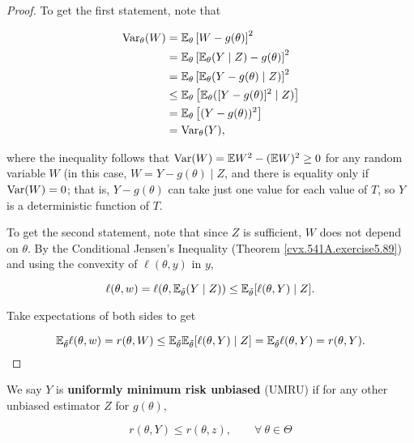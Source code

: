 \begin{proof} 

To get the first statement, note that

\begin{align*}
\Var_\theta(W) & = \mathbb{E}_\theta\left[W - g(\theta) \right]^2 
\\ & = \mathbb{E}_\theta\left[ \E_\theta(Y \mid Z) - g(\theta)\right]^2 
\\ & = \mathbb{E}_\theta\left[ \E_\theta(Y - g(\theta) \mid Z) \right]^2
\\ &  \leq  \mathbb{E}_\theta\left[ \E_\theta([Y - g(\theta)]^2 \mid Z) \right] 
\\ & = \mathbb{E}_\theta\left[ (Y - g(\theta))^2\right] 
\\& = \Var_\theta(Y),
\end{align*}

where the inequality follows that \(\Var(W) = \E W^2 - (\E W)^2 \geq 0\) for any random variable \(W\) (in this case, \(W = Y - g(\theta) \mid Z\), and there is equality only if \(\Var(W) =0\); that is, \(Y - g(\theta)\) can take just one value for each value of \(T\), so \(Y\) is a deterministic function of \(T\).

To get the second statement, note that since \(Z\) is sufficient, \(W\) does not depend on \(\theta\). By the Conditional Jensen's Inequality (Theorem \ref{cvx.541A.exercise5.89}) and using the convexity of \(\ell(\theta, y)\) in \(y\),

\[
\ell(\theta, w) = \ell(\theta, \E_{\tilde{\theta}}(Y \mid Z)) \leq \E_{\tilde{\theta}} [ \ell(\theta, Y) \mid Z].
\]

Take expectations of both sides to get

\[
\E_{\tilde{\theta}} \ell(\theta, w) =  r(\theta, W)  \leq \E_{\tilde{\theta}} \E_{\tilde{\theta}} [ \ell(\theta, Y) \mid Z] = \E_{\tilde{\theta}} \ell(\theta, Y) = r(\theta, Y).
\]

\end{proof}

\begin{definition}We say \(Y\) is \textbf{uniformly minimum risk unbiased} (UMRU) if for any other unbiased estimator \(Z\) for \(g(\theta)\),

\[
r(\theta, Y) \leq r(\theta, z), \qquad \forall \ \theta \in \Theta
\]

\end{definition}

